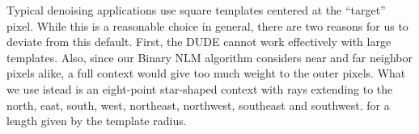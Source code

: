 \documentclass{article}
\begin{document}
Typical denoising applications use square templates centered at the ``target'' pixel. While this is a reasonable choice in general, there are two reasons for us to deviate from this default. First, the DUDE cannot work effectively with large templates. Also, since our Binary NLM algorithm considers near and far neighbor pixels alike, a full context would give too much weight to the outer pixels. What we use istead is an eight-point star-shaped context with rays extending to the north, east, south, west, northeast, northwest, southeast and southwest. for a length given by the template radius.


\end{document}
